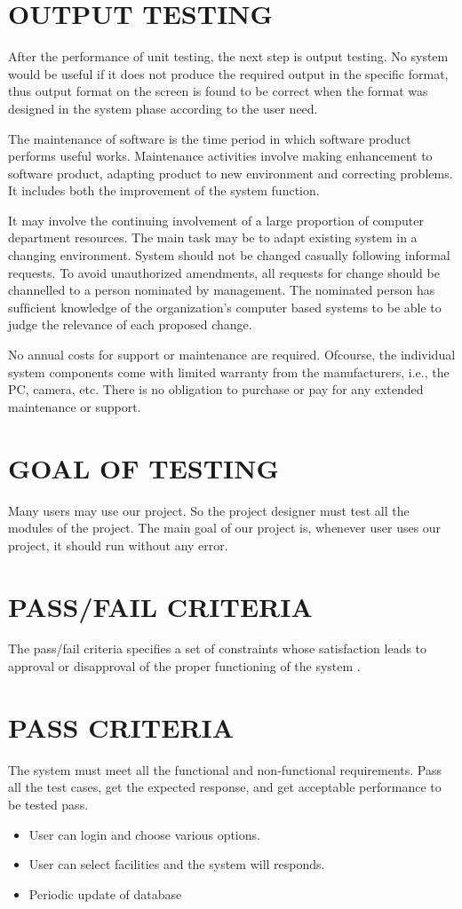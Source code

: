 \documentclass[12pt,a4paper,oneside]{report}
\begin{document}
 \section{OUTPUT TESTING}
 \par After the performance of unit testing, the next step is output testing. No system would be useful if it does not produce the required output in the speciﬁc format, thus output format on the screen is found to be correct when the format was designed in the system phase according to the user need.
 \par The maintenance of software is the time period in which software product performs useful works. Maintenance activities involve making enhancement to software product, adapting product to new environment and correcting problems. It includes both the improvement of the system function.  
\par It may involve the continuing involvement of a large proportion of computer department resources. The main task may be to adapt existing system in a changing environment. System should not be changed casually following informal requests. To avoid unauthorized amendments, all requests for change should be channelled to a person nominated by management. The nominated person has sufﬁcient knowledge of the organization’s computer based systems to be able to judge the relevance of each proposed change. 
\par No annual costs for support or maintenance are required. Ofcourse, the individual system components come with limited warranty from the manufacturers, i.e., the PC, camera, etc. There is no obligation to purchase or pay for any extended maintenance or support.
\section{GOAL OF TESTING}
\par Many users may use our project. So the project designer must test all the modules of the project. The main goal of our project is, whenever user uses our project, it should run without any error.
\section{PASS/FAIL CRITERIA}
\par The pass/fail criteria specifies a set of constraints whose satisfaction leads to approval or disapproval of the proper functioning of the system .
\section{PASS CRITERIA}
\par The system must meet all the functional and non-functional requirements. Pass all the test cases, get the expected response, and get acceptable performance to be tested pass.
\begin{itemize}
\item User can login and choose various options.
\item  User can select facilities and the system will responds.
\item Periodic update of database
\end{itemize}
\end{document}
